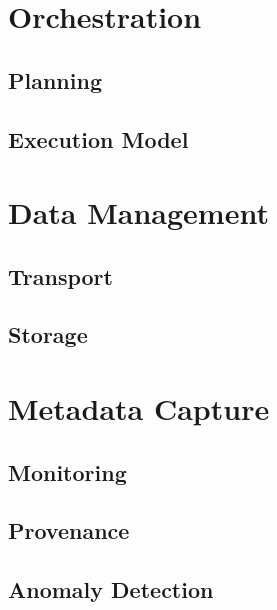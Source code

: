 \section{Orchestration}
\label{sec:classification:orchestration}

\subsection{Planning}
\label{sec:classification:planning}

\subsection{Execution Model}
\label{sec:classification:execution-model}

\section{Data Management}
\label{sec:classification:data-management}

\subsection{Transport}
\label{sec:classification:transport}

\subsection{Storage}
\label{sec:classification:storage}

\section{Metadata Capture}
\label{sec:classification:metadata-capture}

\subsection{Monitoring}
\label{sec:classification:monitoring}

\subsection{Provenance}
\label{sec:classification:provenance}

\subsection{Anomaly Detection}
\label{sec:classification:anomaly-detection}

